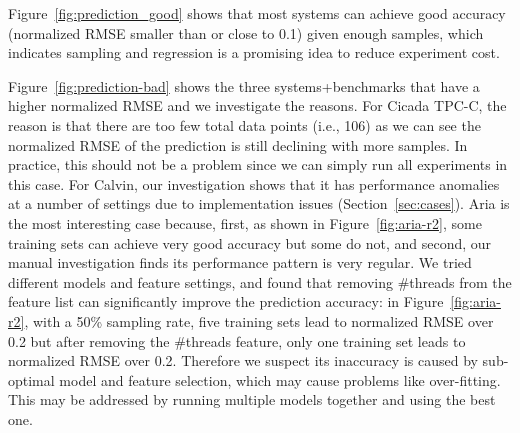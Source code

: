 Figure~\ref{fig:prediction_good} shows that most systems can achieve good
accuracy (normalized RMSE smaller than or close to 0.1) given enough samples,
which indicates sampling and regression is a promising idea to reduce experiment
cost.

Figure~\ref{fig:prediction-bad} shows the three systems+benchmarks that have 
a higher normalized RMSE and we investigate the reasons. For Cicada TPC-C,
the reason is that there are too few total data points (i.e., 106) as we can see the normalized
RMSE of the prediction is still declining with more samples. In practice, this should not be a problem
since we can simply run all experiments in this case. For Calvin, our investigation
shows that it has performance anomalies at a number of settings due to implementation
issues (Section~\ref{sec:cases}).
Aria is the most interesting case because, first, as shown
in Figure~\ref{fig:aria-r2}, some training sets can achieve very good accuracy but
some do not, and second, our manual investigation finds its performance pattern is
very regular. We tried different models and feature settings, and found
that removing \#threads from the feature list can significantly improve the prediction
accuracy: in Figure~\ref{fig:aria-r2}, with a 50\% sampling rate, five training sets lead
to normalized RMSE over 0.2 but after removing the \#threads feature, only one training set
leads to normalized RMSE over 0.2. Therefore we suspect its inaccuracy is caused by sub-optimal model and feature
selection, which may cause problems like over-fitting. This may be addressed by
running multiple models together and using the best one.





